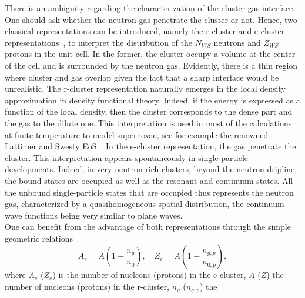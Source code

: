 There is an ambiguity regarding the characterization of the cluster-gas
interface. One should ask whether the neutron gas penetrate the cluster or not.
Hence, two classical representations can be introduced, namely the r-cluster and
e-cluster representations~\cite{Papakonstantinou2013}, to interpret the
distribution
of the $N_{WS}$ neutrons and $Z_{WS}$ protons in the unit cell. In the former, the
cluster occupy a volume at the center of the cell and is surrounded
by the neutron gas. Evidently, there is a thin region where cluster and gas
overlap given the fact that a sharp interface would be unrealistic. The
r-cluster representation naturally emerges in the local density approximation
in density functional theory. Indeed, if the energy is expressed as a function
of the local density, then the cluster corresponds to the dense part and the
gas to the dilute one. This interpretation is used in most of the calculations
at finite temperature to model supernovae, see for example the renowned
Lattimer and Swesty EoS~\cite{Lattimer1991}. In the e-cluster representation,
the gas penetrate the cluster. This interpretation appears spontaneously in
single-particle developments. Indeed, in very neutron-rich clusters, beyond the
neutron dripline, the bound states are occupied as well as the resonant and
continuum states. All the unbound single-particle states that are occupied thus
represents the neutron gas, characterized by a quasihomogeneous spatial 
distribution, the continuum wave functions being very similar to plane waves.
\\
One can benefit from the advantage of both representations through the simple
geometric relations
%
\begin{equation}
  A_e = A\left(1-\frac{n_g}{n_0}\right), \quad 
  Z_e = A\left(1-\frac{n_{g,p}}{n_{0,p}}\right),
\end{equation}
%
where $A_e$ ($Z_e$) is the number of nucleons (protons) in the e-cluster, $A$
($Z$) the number of nucleons (protons) in the r-cluster, $n_g$ ($n_{g,p}$) the 
